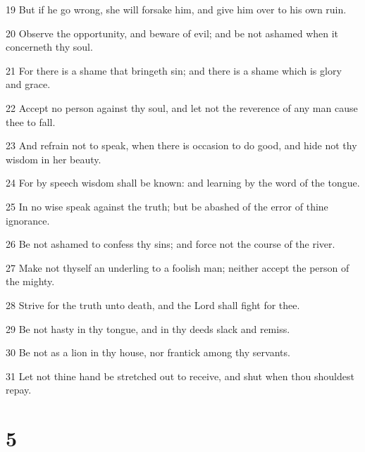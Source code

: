 \par 19 But if he go wrong, she will forsake him, and give him over to his own ruin.
\par 20 Observe the opportunity, and beware of evil; and be not ashamed when it concerneth thy soul.
\par 21 For there is a shame that bringeth sin; and there is a shame which is glory and grace.
\par 22 Accept no person against thy soul, and let not the reverence of any man cause thee to fall.
\par 23 And refrain not to speak, when there is occasion to do good, and hide not thy wisdom in her beauty.
\par 24 For by speech wisdom shall be known: and learning by the word of the tongue.
\par 25 In no wise speak against the truth; but be abashed of the error of thine ignorance.
\par 26 Be not ashamed to confess thy sins; and force not the course of the river.
\par 27 Make not thyself an underling to a foolish man; neither accept the person of the mighty.
\par 28 Strive for the truth unto death, and the Lord shall fight for thee.
\par 29 Be not hasty in thy tongue, and in thy deeds slack and remiss.
\par 30 Be not as a lion in thy house, nor frantick among thy servants.
\par 31 Let not thine hand be stretched out to receive, and shut when thou shouldest repay.

\chapter{5}

